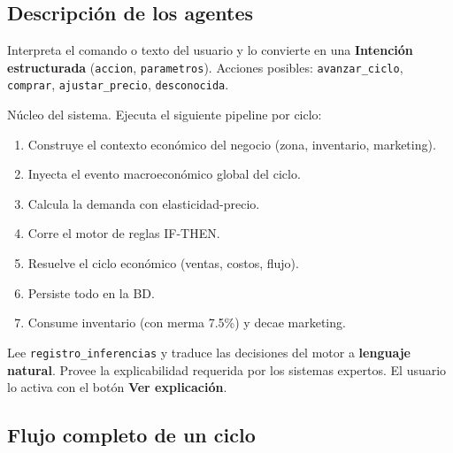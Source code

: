 \documentclass[12pt, a4paper]{article}
\begin{document}
\subsection{Descripción de los agentes}

\begin{infobox}
Interpreta el comando o texto del usuario y lo convierte en una
\textbf{Intención estructurada} (\texttt{accion}, \texttt{parametros}).
Acciones posibles: \texttt{avanzar\_ciclo}, \texttt{comprar},
\texttt{ajustar\_precio}, \texttt{desconocida}.
\end{infobox}

\begin{infobox}
Núcleo del sistema. Ejecuta el siguiente pipeline por ciclo:
\begin{enumerate}[leftmargin=*]
  \item Construye el contexto económico del negocio (zona, inventario, marketing).
  \item Inyecta el evento macroeconómico global del ciclo.
  \item Calcula la demanda con elasticidad-precio.
  \item Corre el motor de reglas IF-THEN.
  \item Resuelve el ciclo económico (ventas, costos, flujo).
  \item Persiste todo en la BD.
  \item Consume inventario (con merma 7.5\%) y decae marketing.
\end{enumerate}
\end{infobox}

\begin{infobox}
Lee \texttt{registro\_inferencias} y traduce las decisiones del motor a
\textbf{lenguaje natural}. Provee la explicabilidad requerida por los
sistemas expertos. El usuario lo activa con el botón \textbf{Ver explicación}.
\end{infobox}

\subsection{Flujo completo de un ciclo}
\end{document}
